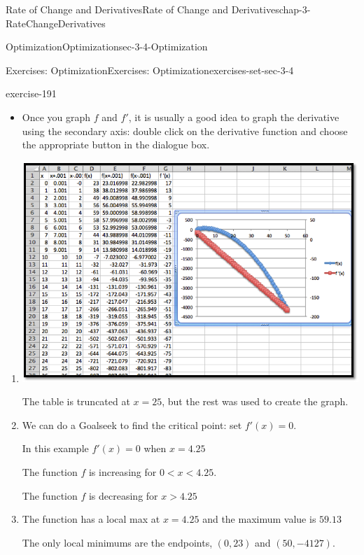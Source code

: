 \documentclass[oneside,10pt,]{book}
\numberwithin{equation}{section}
\newcommand{\lt}{<}
\newcommand{\gt}{>}
\begin{document}
\begin{chapterptx}{Rate of Change and Derivatives}{}{Rate of Change and Derivatives}{}{}{chap-3-RateChangeDerivatives}
\begin{sectionptx}{Optimization}{}{Optimization}{}{}{sec-3-4-Optimization}
\begin{exercises-subsection-numberless}{Exercises: Optimization}{}{Exercises: Optimization}{}{}{exercises-set-sec-3-4}
\begin{exercisegroup}
\begin{divisionexerciseeg}{1}{}{}{exercise-191}
\begin{itemize}[label=\textbullet]
\item{}\hypertarget{p-1248}{}%
Once you graph \(f\) and \(f'\), it is usually a good idea to graph the derivative using the secondary axis: double click on the derivative function and choose the appropriate button in the dialogue box.%
\end{itemize}
\leavevmode%
\begin{enumerate}[label=(\alph*)]
\item\hypertarget{li-392}{}\leavevmode%
\begin{sidebyside}{1}{0.1}{0.1}{0}%
\begin{sbspanel}{0.8}%
\includegraphics[width=1\linewidth]{images/sec3-4-sol1a.png}
\end{sbspanel}%
\end{sidebyside}%
\par
\hypertarget{p-1249}{}%
The table is truncated at \(x = 25\), but the rest was used to create the graph.%
\item\hypertarget{li-393}{}\hypertarget{p-1250}{}%
We can do a Goalseek to find the critical point: set \(f'(x)=0\).%
\par
\hypertarget{p-1251}{}%
In this example \(f'(x)=0\) when \(x = 4.25\)%
\par
\hypertarget{p-1252}{}%
The function \(f\) is increasing for \(0\lt x \lt 4.25\).%
\par
\hypertarget{p-1253}{}%
The function \(f\) is decreasing for \(x\gt 4.25\)%
\item\hypertarget{li-394}{}\hypertarget{p-1254}{}%
The function has a local max at \(x = 4.25\) and the maximum value is \(59.13\)%
\par
\hypertarget{p-1255}{}%
The only local minimums are the endpoints, \((0, 23)\) and \((50, -4127)\).%

\end{enumerate}
\end{divisionexerciseeg}
\end{exercisegroup}
\end{exercises-subsection-numberless}
\end{sectionptx}
\end{chapterptx}
\end{document}
